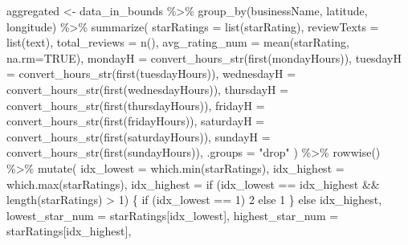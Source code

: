 \documentclass[
  12pt,
  letterpaper,
  DIV=11,
  numbers=noendperiod]{scrartcl}
\newenvironment{Shaded}{\begin{snugshade}}{\end{snugshade}}
\newcommand{\AttributeTok}[1]{\textcolor[rgb]{0.98,0.46,0.51}{#1}}
\newcommand{\ConstantTok}[1]{\textcolor[rgb]{0.47,0.72,1.00}{#1}}
\newcommand{\ControlFlowTok}[1]{\textcolor[rgb]{0.98,0.46,0.51}{#1}}
\newcommand{\DecValTok}[1]{\textcolor[rgb]{0.47,0.72,1.00}{#1}}
\newcommand{\FunctionTok}[1]{\textcolor[rgb]{0.70,0.57,0.94}{#1}}
\newcommand{\NormalTok}[1]{\textcolor[rgb]{0.88,0.89,0.91}{#1}}
\newcommand{\OtherTok}[1]{\textcolor[rgb]{0.70,0.57,0.94}{#1}}
\newcommand{\SpecialCharTok}[1]{\textcolor[rgb]{0.47,0.72,1.00}{#1}}
\newcommand{\StringTok}[1]{\textcolor[rgb]{0.62,0.80,1.00}{#1}}
\begin{document}
\begin{Shaded}
\begin{Highlighting}[]
\NormalTok{    aggregated }\OtherTok{\textless{}{-}}\NormalTok{ data\_in\_bounds }\SpecialCharTok{\%\textgreater{}\%}
      \FunctionTok{group\_by}\NormalTok{(businessName, latitude, longitude) }\SpecialCharTok{\%\textgreater{}\%}
      \FunctionTok{summarize}\NormalTok{(}
        \AttributeTok{starRatings    =} \FunctionTok{list}\NormalTok{(starRating),}
        \AttributeTok{reviewTexts    =} \FunctionTok{list}\NormalTok{(text),}
        \AttributeTok{total\_reviews  =} \FunctionTok{n}\NormalTok{(),}
        \AttributeTok{avg\_rating\_num =} \FunctionTok{mean}\NormalTok{(starRating, }\AttributeTok{na.rm=}\ConstantTok{TRUE}\NormalTok{),}
        \AttributeTok{mondayH        =} \FunctionTok{convert\_hours\_str}\NormalTok{(}\FunctionTok{first}\NormalTok{(mondayHours)),}
        \AttributeTok{tuesdayH       =} \FunctionTok{convert\_hours\_str}\NormalTok{(}\FunctionTok{first}\NormalTok{(tuesdayHours)),}
        \AttributeTok{wednesdayH     =} \FunctionTok{convert\_hours\_str}\NormalTok{(}\FunctionTok{first}\NormalTok{(wednesdayHours)),}
        \AttributeTok{thursdayH      =} \FunctionTok{convert\_hours\_str}\NormalTok{(}\FunctionTok{first}\NormalTok{(thursdayHours)),}
        \AttributeTok{fridayH        =} \FunctionTok{convert\_hours\_str}\NormalTok{(}\FunctionTok{first}\NormalTok{(fridayHours)),}
        \AttributeTok{saturdayH      =} \FunctionTok{convert\_hours\_str}\NormalTok{(}\FunctionTok{first}\NormalTok{(saturdayHours)),}
        \AttributeTok{sundayH        =} \FunctionTok{convert\_hours\_str}\NormalTok{(}\FunctionTok{first}\NormalTok{(sundayHours)),}
        \AttributeTok{.groups        =} \StringTok{"drop"}
\NormalTok{      ) }\SpecialCharTok{\%\textgreater{}\%}
      \FunctionTok{rowwise}\NormalTok{() }\SpecialCharTok{\%\textgreater{}\%}
      \FunctionTok{mutate}\NormalTok{(}
        \AttributeTok{idx\_lowest  =} \FunctionTok{which.min}\NormalTok{(starRatings),}
        \AttributeTok{idx\_highest =} \FunctionTok{which.max}\NormalTok{(starRatings),}
        \AttributeTok{idx\_highest =} \ControlFlowTok{if}\NormalTok{ (idx\_lowest }\SpecialCharTok{==}\NormalTok{ idx\_highest }\SpecialCharTok{\&\&} \FunctionTok{length}\NormalTok{(starRatings) }\SpecialCharTok{\textgreater{}} \DecValTok{1}\NormalTok{) \{}
          \ControlFlowTok{if}\NormalTok{ (idx\_lowest }\SpecialCharTok{==} \DecValTok{1}\NormalTok{) }\DecValTok{2} \ControlFlowTok{else} \DecValTok{1}
\NormalTok{        \} }\ControlFlowTok{else}\NormalTok{ idx\_highest,}
        \AttributeTok{lowest\_star\_num  =}\NormalTok{ starRatings[idx\_lowest],}
        \AttributeTok{highest\_star\_num =}\NormalTok{ starRatings[idx\_highest],}

\end{Highlighting}
\end{Shaded}
\end{document}
